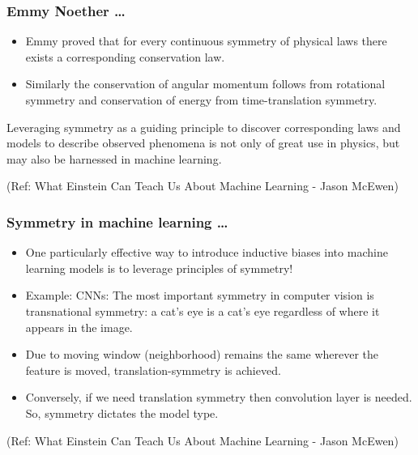 \begin{frame}[fragile]\frametitle{Emmy Noether \ldots}


	\begin{itemize}
	\item Emmy proved that for every continuous symmetry of physical laws there exists a corresponding conservation law.
	\item Similarly the conservation of angular momentum follows from rotational symmetry and conservation of energy from time-translation symmetry.
	\end{itemize}

Leveraging symmetry as a guiding principle to discover corresponding laws and models to describe observed phenomena is not only of great use in physics, but may also be harnessed in machine learning.

{\tiny (Ref: What Einstein Can Teach Us About Machine Learning - Jason McEwen)}

\end{frame}

\begin{frame}[fragile]\frametitle{Symmetry in machine learning \ldots}


	\begin{itemize}
	\item One particularly effective way to introduce inductive biases into machine learning models  is to leverage principles of symmetry!
	\item Example: CNNs: The most important symmetry in computer vision is transnational symmetry: a cat’s eye is a cat’s eye regardless of where it appears in the image.
	\item Due to moving window (neighborhood) remains the same wherever the feature is moved, translation-symmetry is achieved.
	\item Conversely, if we need translation symmetry then convolution layer is needed. So, symmetry dictates the model type.
	\end{itemize}


{\tiny (Ref: What Einstein Can Teach Us About Machine Learning - Jason McEwen)}

\end{frame}

